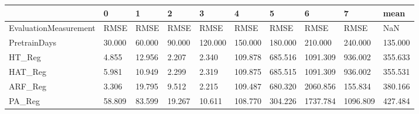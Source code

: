 \begin{tabular}{llllllllll}
\toprule
{} &      0 &      1 &      2 &       3 &       4 &       5 &        6 &        7 &    mean \\
\midrule
EvaluationMeasurement &   RMSE &   RMSE &   RMSE &    RMSE &    RMSE &    RMSE &     RMSE &     RMSE &     NaN \\
PretrainDays          & 30.000 & 60.000 & 90.000 & 120.000 & 150.000 & 180.000 &  210.000 &  240.000 & 135.000 \\
HT\_Reg                &  4.855 & 12.956 &  2.207 &   2.340 & 109.878 & 685.516 & 1091.309 &  936.002 & 355.633 \\
HAT\_Reg               &  5.981 & 10.949 &  2.299 &   2.319 & 109.875 & 685.515 & 1091.309 &  936.002 & 355.531 \\
ARF\_Reg               &  3.306 & 19.795 &  9.512 &   2.215 & 109.487 & 680.320 & 2060.856 &  155.834 & 380.166 \\
PA\_Reg                & 58.809 & 83.599 & 19.267 &  10.611 & 108.770 & 304.226 & 1737.784 & 1096.809 & 427.484 \\
\bottomrule
\end{tabular}
